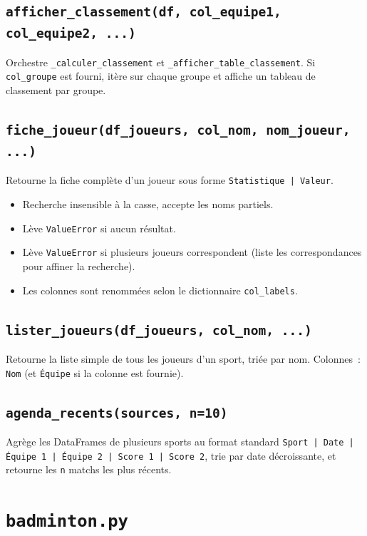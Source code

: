 \documentclass[12pt,a4paper]{article}
\begin{document}
\subsection{\texttt{afficher\_classement(df, col\_equipe1, col\_equipe2, ...)}}

Orchestre \texttt{\_calculer\_classement} et \texttt{\_afficher\_table\_classement}.
Si \texttt{col\_groupe} est fourni, itère sur chaque groupe et affiche un
tableau de classement par groupe.

\subsection{\texttt{fiche\_joueur(df\_joueurs, col\_nom, nom\_joueur, ...)}}

Retourne la fiche complète d'un joueur sous forme \texttt{Statistique | Valeur}.
\begin{itemize}
    \item Recherche insensible à la casse, accepte les noms partiels.
    \item Lève \texttt{ValueError} si aucun résultat.
    \item Lève \texttt{ValueError} si plusieurs joueurs correspondent
    (liste les correspondances pour affiner la recherche).
    \item Les colonnes sont renommées selon le dictionnaire \texttt{col\_labels}.
\end{itemize}

\subsection{\texttt{lister\_joueurs(df\_joueurs, col\_nom, ...)}}

Retourne la liste simple de tous les joueurs d'un sport, triée par nom.
Colonnes~: \texttt{Nom} (et \texttt{Équipe} si la colonne est fournie).

\subsection{\texttt{agenda\_recents(sources, n=10)}}

Agrège les DataFrames de plusieurs sports au format standard
\texttt{Sport | Date | Équipe 1 | Équipe 2 | Score 1 | Score 2}, trie par
date décroissante, et retourne les \texttt{n} matchs les plus récents.

\section{\texttt{badminton.py}}
\end{document}
